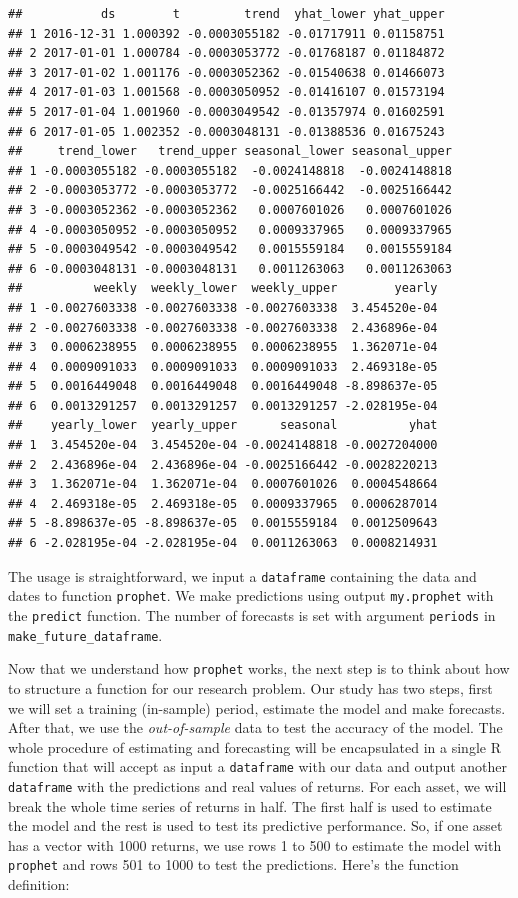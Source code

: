 \documentclass[11pt,]{book}
\begin{document}
\begin{verbatim}
##           ds        t         trend  yhat_lower yhat_upper
## 1 2016-12-31 1.000392 -0.0003055182 -0.01717911 0.01158751
## 2 2017-01-01 1.000784 -0.0003053772 -0.01768187 0.01184872
## 3 2017-01-02 1.001176 -0.0003052362 -0.01540638 0.01466073
## 4 2017-01-03 1.001568 -0.0003050952 -0.01416107 0.01573194
## 5 2017-01-04 1.001960 -0.0003049542 -0.01357974 0.01602591
## 6 2017-01-05 1.002352 -0.0003048131 -0.01388536 0.01675243
##     trend_lower   trend_upper seasonal_lower seasonal_upper
## 1 -0.0003055182 -0.0003055182  -0.0024148818  -0.0024148818
## 2 -0.0003053772 -0.0003053772  -0.0025166442  -0.0025166442
## 3 -0.0003052362 -0.0003052362   0.0007601026   0.0007601026
## 4 -0.0003050952 -0.0003050952   0.0009337965   0.0009337965
## 5 -0.0003049542 -0.0003049542   0.0015559184   0.0015559184
## 6 -0.0003048131 -0.0003048131   0.0011263063   0.0011263063
##          weekly  weekly_lower  weekly_upper        yearly
## 1 -0.0027603338 -0.0027603338 -0.0027603338  3.454520e-04
## 2 -0.0027603338 -0.0027603338 -0.0027603338  2.436896e-04
## 3  0.0006238955  0.0006238955  0.0006238955  1.362071e-04
## 4  0.0009091033  0.0009091033  0.0009091033  2.469318e-05
## 5  0.0016449048  0.0016449048  0.0016449048 -8.898637e-05
## 6  0.0013291257  0.0013291257  0.0013291257 -2.028195e-04
##    yearly_lower  yearly_upper      seasonal          yhat
## 1  3.454520e-04  3.454520e-04 -0.0024148818 -0.0027204000
## 2  2.436896e-04  2.436896e-04 -0.0025166442 -0.0028220213
## 3  1.362071e-04  1.362071e-04  0.0007601026  0.0004548664
## 4  2.469318e-05  2.469318e-05  0.0009337965  0.0006287014
## 5 -8.898637e-05 -8.898637e-05  0.0015559184  0.0012509643
## 6 -2.028195e-04 -2.028195e-04  0.0011263063  0.0008214931
\end{verbatim}

The usage is straightforward, we input a \texttt{dataframe} containing
the data and dates to function \texttt{prophet}. We make predictions
using output \texttt{my.prophet} with the \texttt{predict} function. The
number of forecasts is set with argument \texttt{periods} in
\texttt{make\_future\_dataframe}. 

Now that we understand how \texttt{prophet} works, the next step is to
think about how to structure a function for our research problem. Our
study has two steps, first we will set a training (in-sample) period,
estimate the model and make forecasts. After that, we use the
\emph{out-of-sample} data to test the accuracy of the model. The whole
procedure of estimating and forecasting will be encapsulated in a single
R function that will accept as input a \texttt{dataframe} with our data
and output another \texttt{dataframe} with the predictions and real
values of returns. For each asset, we will break the whole time series
of returns in half. The first half is used to estimate the model and the
rest is used to test its predictive performance. So, if one asset has a
vector with 1000 returns, we use rows 1 to 500 to estimate the model
with \texttt{prophet} and rows 501 to 1000 to test the predictions.
Here's the function definition:
\end{document}
